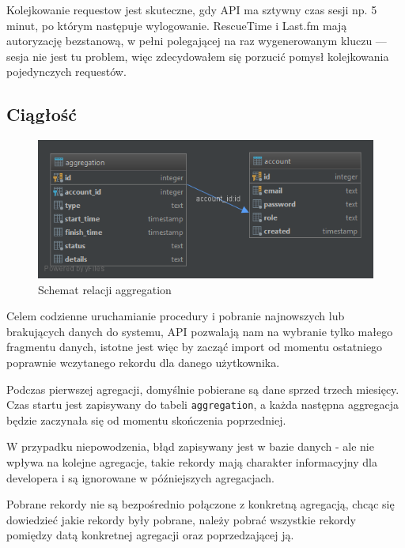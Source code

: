 \documentclass[brudnopis]{xmgr}
\begin{document}
            Kolejkowanie requestow jest skuteczne, gdy API ma sztywny czas sesji np. 5 minut, po którym następuje wylogowanie.
            RescueTime i Last.fm mają autoryzację bezstanową,
            w pełni polegającej na raz wygenerowanym kluczu --- sesja nie jest tu problem,
            więc zdecydowałem się porzucić pomysł kolejkowania pojedynczych requestów.

        \subsection*{Ciągłość}

            \begin{figure}
                \centering
                \includegraphics[width=\textwidth]{fig/db-aggregation.png}
                \caption{Schemat relacji aggregation}
                \label{fig:Relacja aggregation}
            \end{figure}

            Celem codzienne uruchamianie procedury i pobranie najnowszych lub brakujących danych do systemu,
            API pozwalają nam na wybranie tylko małego fragmentu danych, istotne jest więc by zacząć import
            od momentu ostatniego poprawnie wczytanego rekordu dla danego użytkownika.

            Podczas pierwszej agregacji, domyślnie pobierane są dane sprzed trzech miesięcy.
            Czas startu jest zapisywany do tabeli \verb|aggregation|,
            a każda następna aggregacja będzie zaczynała się od momentu skończenia poprzedniej.

            W przypadku niepowodzenia, błąd zapisywany jest w bazie danych - ale nie wpływa na kolejne agregacje,
            takie rekordy mają charakter informacyjny dla developera i są ignorowane w późniejszych agregacjach.

            Pobrane rekordy nie są bezpośrednio połączone z konkretną agregacją,
            chcąc się dowiedzieć jakie rekordy były pobrane, należy pobrać wszystkie rekordy pomiędzy datą konkretnej agregacji oraz poprzedzającej ją.
\end{document}
